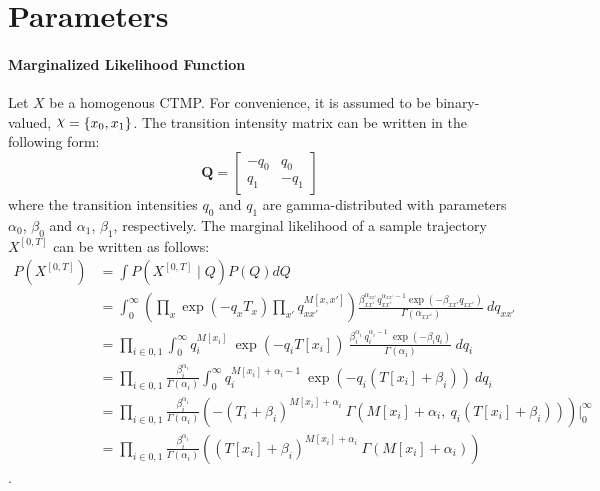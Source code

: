 \section{Parameters}

\paragraph{Marginalized Likelihood Function} 
Let $ X $ be a homogenous CTMP. For convenience, it is assumed to be binary-valued, $ \rchi = \left\lbrace x_{0}, x_{1} \right\rbrace $. The transition intensity matrix can be written in the following form:
\begin{equation}
\textbf{Q} = 
\begin{bmatrix}
-q_{0} & q_{0} \\
q_{1} & -q_{1}
\end{bmatrix}
\end{equation}
where the transition intensities $ q_{0} $ and $ q_{1} $ are gamma-distributed with parameters $ \alpha_{0}$, $ \beta_{0} $ and $ \alpha_{1} $, $ \beta_{1} $, respectively. The marginal likelihood of a sample trajectory $ X^{[0,T]} $ can be written as follows:
\begin{align}
P(X^{[0, T]}) & = \int  P(X^{[0, T]}\mid Q)P(Q) dQ \nonumber\\ & = \int_{0}^{\infty} \left( \prod_{x} \exp(-q_{x}T_{x}) \prod_{x'} q_{xx'}^{M[x, x']}\right) \frac{\beta_{xx'}^{\alpha_{xx'}}{q_{xx'}^{\alpha_{xx'}-1}}\exp(-\beta_{xx'}q_{xx'})}{\Gamma(\alpha_{xx'})} \ dq_{xx'} \nonumber\\ & = \prod_{i\in{0,1}}\int_{0}^{\infty} q_{i}^{M[x_{i}]} \ \exp(-q_{i}T[x_{i}]) \  \frac{\beta_{i}^{\alpha_{i}} \ q_{i}^{\alpha_{i}-1}\ \exp(-\beta_{i}q_{i})}{\Gamma(\alpha_{i})} \ dq_{i} \nonumber\\ & = \prod_{i\in{0,1}} \frac{\beta_{i}^{\alpha_{i}}}{\Gamma(\alpha_{i})} \int_{0}^{\infty} q_{i}^{M[x_{i}] + \alpha_{i} -1} \ \exp(-q_{i}(T[x_{i}]+\beta_{i})) \ dq_{i} \\ & = \prod_{i\in{0,1}} \frac{\beta_{i}^{\alpha_{i}}}{\Gamma(\alpha_{i})} \left( -(T_{i}+\beta_{i})^{M[x_{i}] + \alpha_{i}}\ \Gamma(M[x_{i}] + \alpha_{i}, \ q_{i}(T[x_{i}]+\beta_{i})) \right) \Big|_0^\infty  \\ & = \prod_{i\in{0,1}} \frac{\beta_{i}^{\alpha_{i}}}{\Gamma(\alpha_{i})} \left( (T[x_{i}]+\beta_{i})^{M[x_{i}] + \alpha_{i}}\ \Gamma(M[x_{i}] + \alpha_{i}) \right)
\label{eq:Marg_traj}
\end{align}.
%


